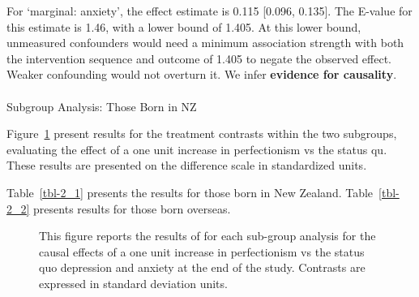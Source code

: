\documentclass[
  single column]{article}
\makeatletter
\let\oldparagraph\paragraph
\renewcommand{\paragraph}{
    \@ifstar
      \xxxParagraphStar
      \xxxParagraphNoStar
  }
\newcommand{\xxxParagraphStar}[1]{\oldparagraph*{#1}\mbox{}}
\newcommand{\xxxParagraphNoStar}[1]{\oldparagraph{#1}\mbox{}}
\makeatother
\begin{document}
For `marginal: anxiety', the effect estimate is 0.115 {[}0.096,
0.135{]}. The E-value for this estimate is 1.46, with a lower bound of
1.405. At this lower bound, unmeasured confounders would need a minimum
association strength with both the intervention sequence and outcome of
1.405 to negate the observed effect. Weaker confounding would not
overturn it. We infer \textbf{evidence for causality}.

\newpage{}

\paragraph{Subgroup Analysis: Those Born in
NZ}\label{subgroup-analysis-those-born-in-nz}

Figure~\ref{fig-2_1} present results for the treatment contrasts within
the two subgroups, evaluating the effect of a one unit increase in
perfectionism vs the status qu. These results are presented on the
difference scale in standardized units.

Table~\ref{tbl-2_1} presents the results for those born in New Zealand.
Table~\ref{tbl-2_2} presents results for those born overseas.

\begin{figure}


\caption{\label{fig-2_1}This figure reports the results of for each
sub-group analysis for the causal effects of a one unit increase in
perfectionism vs the status quo depression and anxiety at the end of the
study. Contrasts are expressed in standard deviation units.}

\end{figure}%
\end{document}

